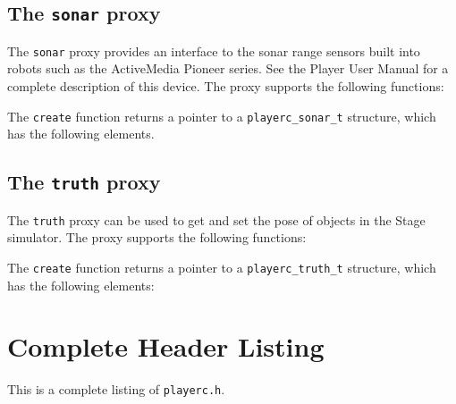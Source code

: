 \documentclass[11pt]{report}
\begin{document}
\newpage
\section{The {\tt sonar} proxy}

The {\tt sonar} proxy provides an interface to the sonar range sensors
built into robots such as the ActiveMedia Pioneer series.  See the
Player User Manual for a complete description of this device.  The
proxy supports the following functions:
\begin{quote}

\end{quote}
The {\tt create} function returns a pointer to a {\tt playerc\_sonar\_t}
structure, which has the following elements.
\begin{quote}

\end{quote}


\newpage
\section{The {\tt truth} proxy}

The {\tt truth} proxy can be used to get and set the pose of objects
in the Stage simulator.  The proxy supports the following functions:
\begin{quote}

\end{quote}
The {\tt create} function returns a pointer to a {\tt playerc\_truth\_t}
structure, which has the following elements:
\begin{quote}

\end{quote}


\appendix

\chapter{Complete Header Listing}

This is a complete listing of {\tt playerc.h}.


\end{document}
